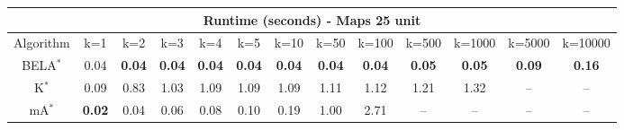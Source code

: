 \begin{tabular}{c|cccccccccccc}\toprule
\multicolumn{13}{c}{Runtime (seconds) - Maps 25 unit}\\ \midrule
Algorithm & k=1 & k=2 & k=3 & k=4 & k=5 & k=10 & k=50 & k=100 & k=500 & k=1000 & k=5000 & k=10000 \\ \midrule
BELA$^*$ & 0.04 & \textbf{0.04} & \textbf{0.04} & \textbf{0.04} & \textbf{0.04} & \textbf{0.04} & \textbf{0.04} & \textbf{0.04} & \textbf{0.05} & \textbf{0.05} & \textbf{0.09} & \textbf{0.16} \\
K$^*$ & 0.09 & 0.83 & 1.03 & 1.09 & 1.09 & 1.09 & 1.11 & 1.12 & 1.21 & 1.32 & -- & -- \\
mA$^*$ & \textbf{0.02} & 0.04 & 0.06 & 0.08 & 0.10 & 0.19 & 1.00 & 2.71 & -- & -- & -- & -- \\ \bottomrule 
\end{tabular}
